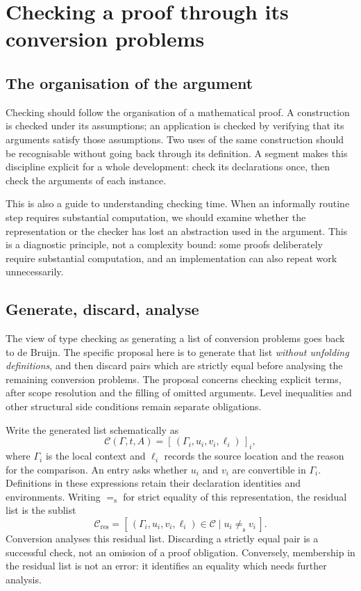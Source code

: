 \documentclass[11pt]{article}
\theoremstyle{remark}
\begin{document}
\section{Checking a proof through its conversion problems}\label{sec:obligations}

\subsection{The organisation of the argument}

Checking should follow the organisation of a mathematical proof. A
construction is checked under its assumptions; an application is checked
by verifying that its arguments satisfy those assumptions. Two uses of
the same construction should be recognisable without going back through
its definition. A segment makes this discipline explicit for a whole
development: check its declarations once, then check the arguments of
each instance.

This is also a guide to understanding checking time. When an informally
routine step requires substantial computation, we should examine whether
the representation or the checker has lost an abstraction used in the
argument. This is a diagnostic principle, not a complexity bound:
some proofs deliberately require substantial computation, and an
implementation can also repeat work unnecessarily.

\subsection{Generate, discard, analyse}

The view of type checking as generating a list of conversion problems
goes back to de Bruijn. The specific proposal here is to generate that
list \emph{without unfolding definitions}, and then discard pairs which
are strictly equal before analysing the remaining conversion problems.
The proposal concerns checking explicit terms, after scope resolution and
the filling of omitted arguments. Level inequalities and other structural
side conditions remain separate obligations.

Write the generated list schematically as
\[
  \mathcal C(\Gamma,t,A)
     = [\,(\Gamma_i,u_i,v_i,\ell_i)\,]_i,
\]
where $\Gamma_i$ is the local context and $\ell_i$ records the source
location and the reason for the comparison. An entry asks whether $u_i$
and $v_i$ are convertible in $\Gamma_i$. Definitions in these expressions
retain their declaration identities and environments. Writing
$=_{\mathrm{s}}$ for strict equality of this representation, the residual
list is the sublist
\[
  \mathcal C_{\mathrm{res}}
    = [\,(\Gamma_i,u_i,v_i,\ell_i)\in\mathcal C
          \mid u_i\not=_{\mathrm{s}}v_i\,].
\]
Conversion analyses this residual list. Discarding a strictly equal pair
is a successful check, not an omission of a proof obligation. Conversely,
membership in the residual list is not an error: it identifies an
equality which needs further analysis.
\end{document}
